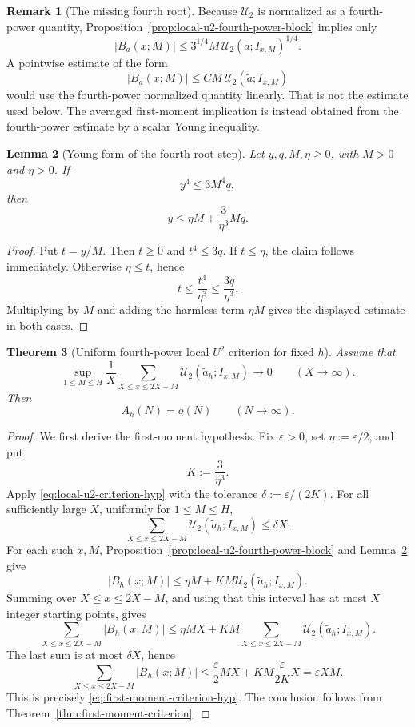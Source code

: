 \documentclass[11pt]{scrartcl}
\numberwithin{equation}{section}
\newtheorem{theorem}{Theorem}[section]
\newtheorem{lemma}[theorem]{Lemma}
\theoremstyle{definition}
\newtheorem{remark}[theorem]{Remark}
\newcommand{\1}{\mathbf 1}
\newcommand{\abs}[1]{\left|#1\right|}
\begin{document}
\begin{remark}[The missing fourth root]
\label{rem:local-u2-fourth-root}
Because $\mathcal U_2$ is normalized as a fourth-power quantity, Proposition~\ref{prop:local-u2-fourth-power-block} implies only
\[
\abs{B_a(x;M)}
\le
3^{1/4}M\,\mathcal U_2(\widetilde a;I_{x,M})^{1/4}.
\]
A pointwise estimate of the form
\[
\abs{B_a(x;M)}\le C M\,\mathcal U_2(\widetilde a;I_{x,M})
\]
would use the fourth-power normalized quantity linearly. That is not the estimate used below. The averaged first-moment implication is instead obtained from the fourth-power estimate by a scalar Young inequality.
\end{remark}

\begin{lemma}[Young form of the fourth-root step]
\label{lem:young-fourth-scaled}
Let $y,q,M,\eta\ge0$, with $M>0$ and $\eta>0$. If
\[
y^4\le3M^4q,
\]
then
\[
y\le \eta M+\frac{3}{\eta^3}Mq.
\]
\end{lemma}

\begin{proof}
Put $t=y/M$. Then $t\ge0$ and $t^4\le3q$. If $t\le\eta$, the claim follows immediately. Otherwise $\eta\le t$, hence
\[
t\le \frac{t^4}{\eta^3}\le\frac{3q}{\eta^3}.
\]
Multiplying by $M$ and adding the harmless term $\eta M$ gives the displayed estimate in both cases.
\end{proof}

\begin{theorem}[Uniform fourth-power local $U^2$ criterion for fixed $h$]
\label{thm:local-u2-criterion}
Assume that
\begin{equation}
\label{eq:local-u2-criterion-hyp}
\sup_{1\le M\le H}
\frac{1}{X}
\sum_{X\le x\le 2X-M}
\mathcal U_2(\widetilde a_h;I_{x,M})
\to0
\qquad (X\to\infty).
\end{equation}
Then
\[
A_h(N)=o(N)
\qquad (N\to\infty).
\]
\end{theorem}

\begin{proof}
We first derive the first-moment hypothesis. Fix $\varepsilon>0$, set $\eta:=\varepsilon/2$, and put
\[
K:=\frac{3}{\eta^3}.
\]
Apply \eqref{eq:local-u2-criterion-hyp} with the tolerance $\delta:=\varepsilon/(2K)$. For all sufficiently large $X$, uniformly for $1\le M\le H$,
\[
\sum_{X\le x\le2X-M}\mathcal U_2(\widetilde a_h;I_{x,M})
\le \delta X.
\]
For each such $x,M$, Proposition~\ref{prop:local-u2-fourth-power-block} and Lemma~\ref{lem:young-fourth-scaled} give
\[
\abs{B_h(x;M)}
\le
\eta M+K M\mathcal U_2(\widetilde a_h;I_{x,M}).
\]
Summing over $X\le x\le2X-M$, and using that this interval has at most $X$ integer starting points, gives
\[
\sum_{X\le x\le2X-M}\abs{B_h(x;M)}
\le
\eta MX+KM\sum_{X\le x\le2X-M}\mathcal U_2(\widetilde a_h;I_{x,M}).
\]
The last sum is at most $\delta X$, hence
\[
\sum_{X\le x\le2X-M}\abs{B_h(x;M)}
\le
\frac{\varepsilon}{2}MX+KM\frac{\varepsilon}{2K}X
=\varepsilon XM.
\]
This is precisely \eqref{eq:first-moment-criterion-hyp}. The conclusion follows from Theorem~\ref{thm:first-moment-criterion}.
\end{proof}
\end{document}
